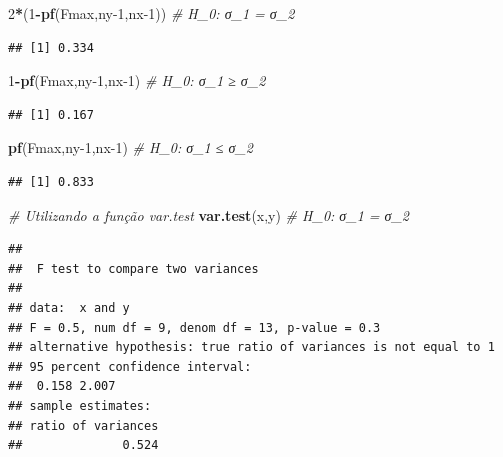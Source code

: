 \documentclass[
]{book}
\newenvironment{Shaded}{\begin{snugshade}}{\end{snugshade}}
\newcommand{\CommentTok}[1]{\textcolor[rgb]{0.56,0.35,0.01}{\textit{#1}}}
\newcommand{\DecValTok}[1]{\textcolor[rgb]{0.00,0.00,0.81}{#1}}
\newcommand{\KeywordTok}[1]{\textcolor[rgb]{0.13,0.29,0.53}{\textbf{#1}}}
\newcommand{\NormalTok}[1]{#1}
\newcommand{\OperatorTok}[1]{\textcolor[rgb]{0.81,0.36,0.00}{\textbf{#1}}}
\theoremstyle{definition}
\theoremstyle{definition}
\theoremstyle{definition}
\theoremstyle{remark}
\begin{document}
\begin{Shaded}
\begin{Highlighting}[]
\DecValTok{2}\OperatorTok{*}\NormalTok{(}\DecValTok{1}\OperatorTok{{-}}\KeywordTok{pf}\NormalTok{(Fmax,ny}\DecValTok{{-}1}\NormalTok{,nx}\DecValTok{{-}1}\NormalTok{)) }\CommentTok{\# H\_0: σ\_1 = σ\_2}
\end{Highlighting}
\end{Shaded}

\begin{verbatim}
## [1] 0.334
\end{verbatim}

\begin{Shaded}
\begin{Highlighting}[]
\DecValTok{1}\OperatorTok{{-}}\KeywordTok{pf}\NormalTok{(Fmax,ny}\DecValTok{{-}1}\NormalTok{,nx}\DecValTok{{-}1}\NormalTok{) }\CommentTok{\# H\_0: σ\_1 ≥ σ\_2}
\end{Highlighting}
\end{Shaded}

\begin{verbatim}
## [1] 0.167
\end{verbatim}

\begin{Shaded}
\begin{Highlighting}[]
\KeywordTok{pf}\NormalTok{(Fmax,ny}\DecValTok{{-}1}\NormalTok{,nx}\DecValTok{{-}1}\NormalTok{) }\CommentTok{\# H\_0: σ\_1 ≤ σ\_2}
\end{Highlighting}
\end{Shaded}

\begin{verbatim}
## [1] 0.833
\end{verbatim}

\begin{Shaded}
\begin{Highlighting}[]
\CommentTok{\# Utilizando a função var.test}
\KeywordTok{var.test}\NormalTok{(x,y) }\CommentTok{\# H\_0: σ\_1 = σ\_2}
\end{Highlighting}
\end{Shaded}

\begin{verbatim}
## 
##  F test to compare two variances
## 
## data:  x and y
## F = 0.5, num df = 9, denom df = 13, p-value = 0.3
## alternative hypothesis: true ratio of variances is not equal to 1
## 95 percent confidence interval:
##  0.158 2.007
## sample estimates:
## ratio of variances 
##              0.524
\end{verbatim}
\end{document}
